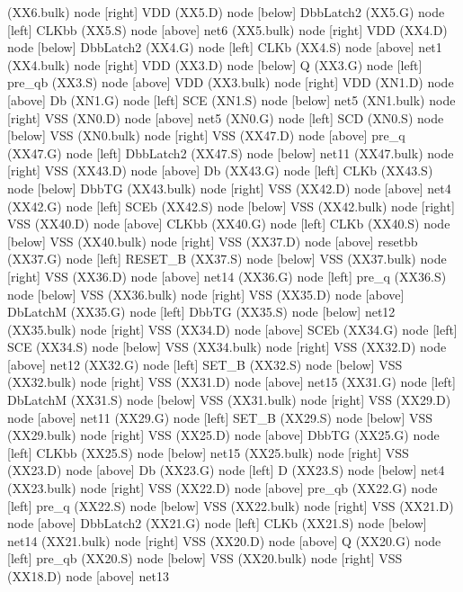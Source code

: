 \begin{circuitikz}[american]
	(XX6.bulk) node [right]	{VDD}
	(XX5.D) node [below]	{DbbLatch2}
	(XX5.G) node [left]	{CLKbb}
	(XX5.S) node [above]	{net6}
	(XX5.bulk) node [right]	{VDD}
	(XX4.D) node [below]	{DbbLatch2}
	(XX4.G) node [left]	{CLKb}
	(XX4.S) node [above]	{net1}
	(XX4.bulk) node [right]	{VDD}
	(XX3.D) node [below]	{Q}
	(XX3.G) node [left]	{pre\_qb}
	(XX3.S) node [above]	{VDD}
	(XX3.bulk) node [right]	{VDD}
	(XN1.D) node [above]	{Db}
	(XN1.G) node [left]	{SCE}
	(XN1.S) node [below]	{net5}
	(XN1.bulk) node [right]	{VSS}
	(XN0.D) node [above]	{net5}
	(XN0.G) node [left]	{SCD}
	(XN0.S) node [below]	{VSS}
	(XN0.bulk) node [right]	{VSS}
	(XX47.D) node [above]	{pre\_q}
	(XX47.G) node [left]	{DbbLatch2}
	(XX47.S) node [below]	{net11}
	(XX47.bulk) node [right]	{VSS}
	(XX43.D) node [above]	{Db}
	(XX43.G) node [left]	{CLKb}
	(XX43.S) node [below]	{DbbTG}
	(XX43.bulk) node [right]	{VSS}
	(XX42.D) node [above]	{net4}
	(XX42.G) node [left]	{SCEb}
	(XX42.S) node [below]	{VSS}
	(XX42.bulk) node [right]	{VSS}
	(XX40.D) node [above]	{CLKbb}
	(XX40.G) node [left]	{CLKb}
	(XX40.S) node [below]	{VSS}
	(XX40.bulk) node [right]	{VSS}
	(XX37.D) node [above]	{resetbb}
	(XX37.G) node [left]	{RESET\_B}
	(XX37.S) node [below]	{VSS}
	(XX37.bulk) node [right]	{VSS}
	(XX36.D) node [above]	{net14}
	(XX36.G) node [left]	{pre\_q}
	(XX36.S) node [below]	{VSS}
	(XX36.bulk) node [right]	{VSS}
	(XX35.D) node [above]	{DbLatchM}
	(XX35.G) node [left]	{DbbTG}
	(XX35.S) node [below]	{net12}
	(XX35.bulk) node [right]	{VSS}
	(XX34.D) node [above]	{SCEb}
	(XX34.G) node [left]	{SCE}
	(XX34.S) node [below]	{VSS}
	(XX34.bulk) node [right]	{VSS}
	(XX32.D) node [above]	{net12}
	(XX32.G) node [left]	{SET\_B}
	(XX32.S) node [below]	{VSS}
	(XX32.bulk) node [right]	{VSS}
	(XX31.D) node [above]	{net15}
	(XX31.G) node [left]	{DbLatchM}
	(XX31.S) node [below]	{VSS}
	(XX31.bulk) node [right]	{VSS}
	(XX29.D) node [above]	{net11}
	(XX29.G) node [left]	{SET\_B}
	(XX29.S) node [below]	{VSS}
	(XX29.bulk) node [right]	{VSS}
	(XX25.D) node [above]	{DbbTG}
	(XX25.G) node [left]	{CLKbb}
	(XX25.S) node [below]	{net15}
	(XX25.bulk) node [right]	{VSS}
	(XX23.D) node [above]	{Db}
	(XX23.G) node [left]	{D}
	(XX23.S) node [below]	{net4}
	(XX23.bulk) node [right]	{VSS}
	(XX22.D) node [above]	{pre\_qb}
	(XX22.G) node [left]	{pre\_q}
	(XX22.S) node [below]	{VSS}
	(XX22.bulk) node [right]	{VSS}
	(XX21.D) node [above]	{DbbLatch2}
	(XX21.G) node [left]	{CLKb}
	(XX21.S) node [below]	{net14}
	(XX21.bulk) node [right]	{VSS}
	(XX20.D) node [above]	{Q}
	(XX20.G) node [left]	{pre\_qb}
	(XX20.S) node [below]	{VSS}
	(XX20.bulk) node [right]	{VSS}
	(XX18.D) node [above]	{net13}

\end{circuitikz}
